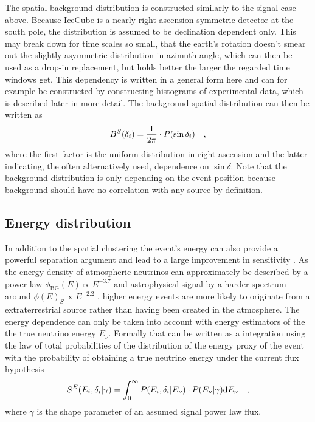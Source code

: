 The spatial background distribution is constructed similarly to the signal case above.
Because IceCube is a nearly right-ascension symmetric detector at the south pole, the distribution is assumed to be declination dependent only.
This may break down for time scales so small, that the earth's rotation doesn't smear out the slightly asymmetric distribution in azimuth angle, which can then be used as a drop-in replacement, but holds better the larger the regarded time windows get.
This dependency is written in a general form here and can for example be constructed by constructing histograms of experimental data, which is described later in more detail.
The background spatial distribution can then be written as
\begin{equation}
  B^S(\delta_i) = \frac{1}{2\pi} \cdot P(\sin\delta_i)
  \quad\text{,}
\end{equation}
where the first factor is the uniform distribution in right-ascension and the latter indicating, the often alternatively used, dependence on $\sin\delta$.
Note that the background distribution is only depending on the event position because background should have no correlation with any source by definition.

\subsection{Energy distribution}
In addition to the spatial clustering the event's energy can also provide a powerful separation argument and lead to a large improvement in sensitivity .
As the energy density of atmospheric neutrinos can approximately be described by a power law $\phi_\mathrm{BG}(E) \propto E^{-3.7}$ and astrophysical signal by a harder spectrum around $\phi(E)_S \propto E^{-2.2}$ , higher energy events are more likely to originate from a extraterrestrial source rather than having been created in the atmosphere.
The energy dependence can only be taken into account with energy estimators of the the true neutrino energy $E_\nu$.
Formally that can be written as a integration using the law of total probabilities of the distribution of the energy proxy of the event with the probability of obtaining a true neutrino energy under the current flux hypothesis
\begin{equation}
  S^E(E_i, \delta_i|\gamma) =
    \int_0^\infty P(E_i,\delta_i|E_\nu)\cdot P(E_\nu|\gamma) \mathrm{d}E_\nu
    \quad\text{,}
\end{equation}
where $\gamma$ is the shape parameter of an assumed signal power law flux.

